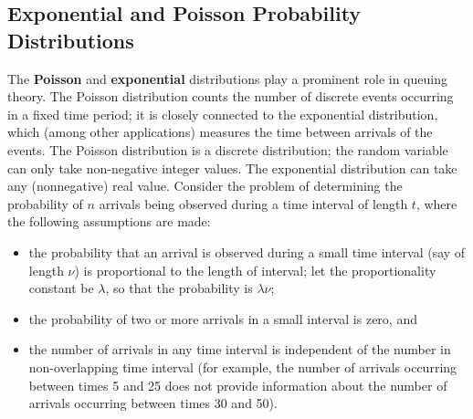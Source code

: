 \subsection{Exponential and Poisson Probability Distributions}
The \textbf{Poisson} and \textbf{exponential} distributions play a prominent role in queuing theory. The Poisson distribution counts the number of discrete events occurring in a fixed time period; it is closely connected to the exponential distribution, which (among other applications) measures the time between arrivals of the events. The Poisson distribution is a discrete distribution; the random variable can only take non-negative integer values. The exponential distribution can take any (nonnegative) real value.
\newl Consider the problem of determining the probability of $n$ arrivals being observed during a time interval of length $t$, where the following assumptions are made:
\begin{itemize}
\item the probability that an arrival is observed during a small time interval (say of length $\nu$) is proportional to the length of interval; let the proportionality constant be $\lambda$, so that the probability is $\lambda\nu$;
\item the probability of two or more arrivals in a small interval is zero, and 
\item the number of arrivals in any time interval is independent of the number in non-overlapping time interval (for example, the number of arrivals occurring between times 5 and 25 does not provide information about the number of arrivals occurring between times 30 and 50).
\end{itemize}

